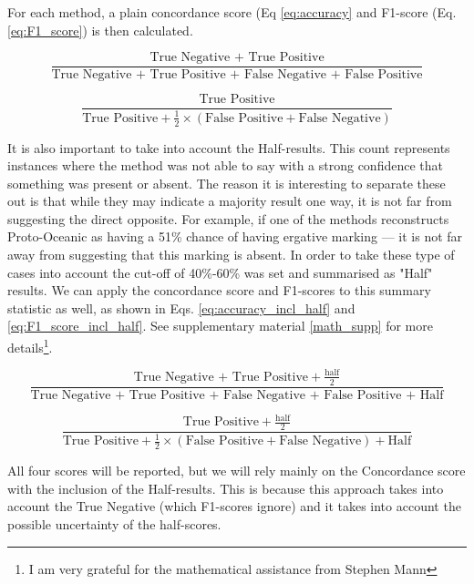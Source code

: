 \documentclass[a4paper,10pt]{article} %
\begin{document}
For each method, a plain concordance score (Eq \eqref{eq:accuracy} and F1-score (Eq. \eqref{eq:F1_score}) is then calculated.

\begin{equation}\label{eq:accuracy}
\frac{\text{True Negative + True Positive}}{\text{True Negative + True Positive + False Negative + False Positive}}
\end{equation}

\begin{equation}\label{eq:F1_score}
\frac{\text{True Positive} }
{\text{True Positive} + \frac{1}{2}\times(\text{False Positive} + \text{False Negative})}
\end{equation}

It is also important to take into account the Half-results. This count represents instances where the method was not able to say with a strong confidence that something was present or absent. The reason it is interesting to separate these out is that while they may indicate a majority result one way, it is not far from suggesting the direct opposite. For example, if one of the methods reconstructs Proto-Oceanic as having a 51\% chance of having ergative marking --- it is not far away from suggesting that this marking is absent. In order to take these type of cases into account the cut-off of 40\%-60\% was set and summarised as "Half" results. We can apply the concordance score and F1-scores to this summary statistic as well, as shown in Eqs. \eqref{eq:accuracy_incl_half} and \eqref{eq:F1_score_incl_half}. See supplementary material \ref{math_supp} for more details\footnote{I am very grateful for the mathematical assistance from Stephen Mann}.

\begin{equation}\label{eq:accuracy_incl_half}
\frac{\text{True Negative + True Positive} + \frac{\text{half}}{2}}{\text{True Negative + True Positive + False Negative + False Positive + Half}}
\end{equation}

\begin{equation}\label{eq:F1_score_incl_half}
\frac{\text{True Positive} +  \frac{\text{half}}{2}} 
{\text{True Positive} + \frac{1}{2}\times(\text{False Positive} + \text{False Negative}) + \text{Half}}
\end{equation}


All four scores will be reported, but we will rely mainly on the Concordance score with the inclusion of the Half-results. This is because this approach takes into account the True Negative (which F1-scores ignore) and it takes into account the possible uncertainty of the half-scores.
\end{document}
